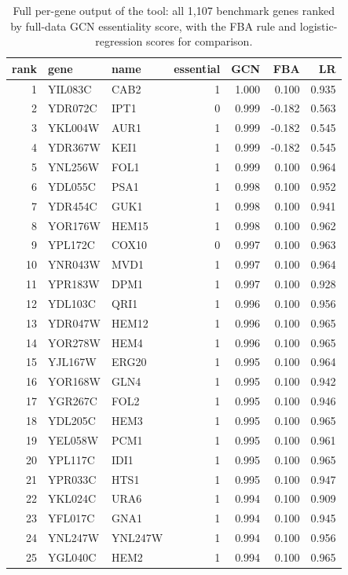 \begin{longtable}{rllrrrr}
\caption{Full per-gene output of the tool: all 1{,}107 benchmark genes ranked by full-data GCN essentiality score, with the FBA rule and logistic-regression scores for comparison.}\label{tab:allscores}\\
\hline\hline
rank & gene & name & essential & GCN & FBA & LR\\
\hline
\endhead
1 & YIL083C & CAB2 & 1 & 1.000 & 0.100 & 0.935\\
2 & YDR072C & IPT1 & 0 & 0.999 & -0.182 & 0.563\\
3 & YKL004W & AUR1 & 1 & 0.999 & -0.182 & 0.545\\
4 & YDR367W & KEI1 & 1 & 0.999 & -0.182 & 0.545\\
5 & YNL256W & FOL1 & 1 & 0.999 & 0.100 & 0.964\\
6 & YDL055C & PSA1 & 1 & 0.998 & 0.100 & 0.952\\
7 & YDR454C & GUK1 & 1 & 0.998 & 0.100 & 0.941\\
8 & YOR176W & HEM15 & 1 & 0.998 & 0.100 & 0.962\\
9 & YPL172C & COX10 & 0 & 0.997 & 0.100 & 0.963\\
10 & YNR043W & MVD1 & 1 & 0.997 & 0.100 & 0.964\\
11 & YPR183W & DPM1 & 1 & 0.997 & 0.100 & 0.928\\
12 & YDL103C & QRI1 & 1 & 0.996 & 0.100 & 0.956\\
13 & YDR047W & HEM12 & 1 & 0.996 & 0.100 & 0.965\\
14 & YOR278W & HEM4 & 1 & 0.996 & 0.100 & 0.965\\
15 & YJL167W & ERG20 & 1 & 0.995 & 0.100 & 0.964\\
16 & YOR168W & GLN4 & 1 & 0.995 & 0.100 & 0.942\\
17 & YGR267C & FOL2 & 1 & 0.995 & 0.100 & 0.946\\
18 & YDL205C & HEM3 & 1 & 0.995 & 0.100 & 0.965\\
19 & YEL058W & PCM1 & 1 & 0.995 & 0.100 & 0.961\\
20 & YPL117C & IDI1 & 1 & 0.995 & 0.100 & 0.965\\
21 & YPR033C & HTS1 & 1 & 0.995 & 0.100 & 0.947\\
22 & YKL024C & URA6 & 1 & 0.994 & 0.100 & 0.909\\
23 & YFL017C & GNA1 & 1 & 0.994 & 0.100 & 0.945\\
24 & YNL247W & YNL247W & 1 & 0.994 & 0.100 & 0.956\\
25 & YGL040C & HEM2 & 1 & 0.994 & 0.100 & 0.965\\

\end{longtable}
